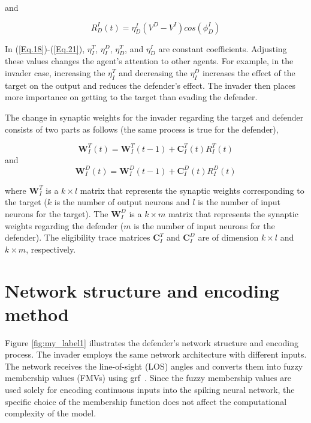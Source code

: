 \noindent and

\begin{equation} \label{Eq.21}
    R_{D}^{I}(t) = \eta_{D}^{I}\left(V^{D}-V^{I}\right)cos\left(\phi_{D}^{I}\right)
\end{equation}

\noindent In (\ref{Eq.18})-(\ref{Eq.21}), $\eta_{I}^{T}$, $\eta_{I}^{D}$, $\eta_{D}^{T}$, and $\eta_{D}^{I}$ are constant coefficients. Adjusting these values changes the agent's attention to other agents. For example, in the invader case, increasing the $\eta_{I}^{T}$ and decreasing the $\eta_{I}^{D}$ increases the effect of the target on the output and reduces the defender's effect. The invader then places more importance on getting to the target than evading the defender.

The change in synaptic weights for the invader regarding the target and defender consists of two parts as follows (the same process is true for the defender),

\begin{equation} \label{Eq.22}
    \mathbf{W}_{I}^{T}(t) = \mathbf{W}_{I}^{T}(t-1) + \mathbf{C}_{I}^{T}(t)R_{I}^{T}(t)
\end{equation}
\noindent and
\begin{equation} \label{Eq.23}
    \mathbf{W}_{I}^{D}(t) = \mathbf{W}_{I}^{D}(t-1) + \mathbf{C}_{I}^{D}(t)R_{I}^{D}(t)
\end{equation}

\noindent where $\mathbf{W}_{I}^{T}$ is a $k\times l$ matrix that represents the synaptic weights corresponding to the target ($k$ is the number of output neurons and $l$ is the number of input neurons for the target). The $\mathbf{W}_{I}^{D}$ is a $k\times m$ matrix that represents the synaptic weights regarding the defender ($m$ is the number of input neurons for the defender). The eligibility trace matrices $\mathbf{C}_{I}^{T}$ and $\mathbf{C}_{I}^{D}$ are of dimension $k\times l$ and $k\times m$, respectively.

\section{Network structure and encoding method}

Figure \ref{fig:my_label1} illustrates the defender’s network structure and encoding process. The invader employs the same network architecture with different inputs. The network receives the line-of-sight (LOS) angles and converts them into fuzzy membership values (FMVs) using \ac{grf}~\cite{Ch5_SNNModel1}. Since the fuzzy membership values are used solely for encoding continuous inputs into the spiking neural network, the specific choice of the membership function does not affect the computational complexity of the model.

